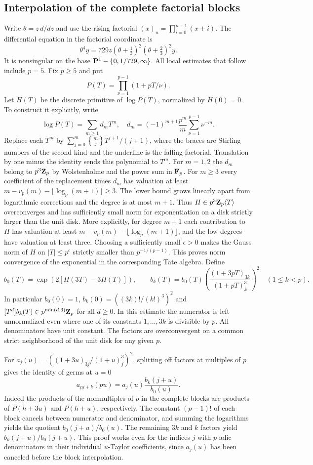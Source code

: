 \documentclass[11pt,letterpaper]{article}
\theoremstyle{definition}
\theoremstyle{remark}
\begin{document}
\subsection{Interpolation of the complete factorial blocks}
Write $\theta=z\,d/dz$ and use the rising factorial $(x)_n=\prod_{i=0}^{n-1}(x+i)$.
The differential equation in the factorial coordinate is
\begin{equation}\label{IV:eq:pf-shift}
 \theta^4 y=729z(\theta+\tfrac13)^2(\theta+\tfrac23)^2y .
\end{equation}
It is nonsingular on the base $\mathbf P^1-\{0,1/729,\infty\}$.
All local estimates that follow include $p=5$.
Fix $p\ge5$ and put
\[
 P(T)=\prod_{\nu=1}^{p-1}(1+pT/\nu).
\]
Let $H(T)$ be the discrete primitive of $\log P(T)$, normalized by
$H(0)=0$. To construct it explicitly, write
\[
 \log P(T)=\sum_{m\ge1}d_m T^m,\quad
 d_m=(-1)^{m+1}\frac{p^m}{m}\sum_{\nu=1}^{p-1}\nu^{-m}.
\]
Replace each $T^m$ by
$\sum_{j=0}^m \genfrac{\{}{\}}{0pt}{}{m}{j}T^{\underline{j+1}}/(j+1)$, where the
braces are Stirling numbers of the second kind and the underline is
the falling factorial. Translation by one minus the identity sends
this polynomial to $T^m$. For $m=1,2$ the $d_m$ belong to
$p^3\mathbf Z_p$ by Wolstenholme and the power sum in $\mathbf F_p$.
For $m\ge3$ every coefficient of the replacement times $d_m$ has
valuation at least $m-v_p(m)-\lfloor\log_p(m+1)\rfloor\ge3$.
The lower bound grows linearly apart from logarithmic corrections and
the degree is at most $m+1$. Thus $H\in p^3\mathbf Z_p\langle T\rangle$
overconverges and has sufficiently small norm for exponentiation on
a disk strictly larger than the unit disk. More explicitly, for degree
$m+1$ each contribution to $H$ has valuation at least
$m-v_p(m)-\lfloor\log_p(m+1)\rfloor$, and the low degrees have
valuation at least three. Choosing a sufficiently small $\epsilon>0$
makes the Gauss norm of $H$ on $|T|\le p^\epsilon$ strictly smaller
than $p^{-1/(p-1)}$. This proves norm convergence of the exponential
in the corresponding Tate algebra. Define
\[
 b_0(T)=\exp(2[H(3T)-3H(T)]),\qquad
 b_k(T)=b_0(T)\left(\frac{(1+3pT)_{3k}}{(1+pT)_k^3}\right)^2
 \quad (1\le k<p).
\]
In particular $b_0(0)=1$, $b_k(0)=((3k)!/(k!)^3)^2$ and
$[T^d]b_k(T)\in p^{\min(d,3)}\mathbf Z_p$ for all $d\ge0$.
In this estimate the numerator is left unnormalized even where one
of its constants $1,\ldots,3k$ is divisible by $p$. All denominators
have unit constant. The factors are overconvergent on a common strict
neighborhood of the unit disk for any given $p$.

For $a_j(u)=((1+3u)_{3j}/(1+u)_j^3)^2$, splitting off factors
at multiples of $p$ gives the identity of germs at $u=0$
\[
 a_{pj+k}(pu)=a_j(u)\frac{b_k(j+u)}{b_0(u)} .
\]
Indeed the products of the nonmultiples of $p$ in the complete blocks
are products of $P(h+3u)$ and $P(h+u)$, respectively. The constant
$(p-1)!$ of each block cancels between numerator and denominator, and
summing the logarithms yields the quotient $b_0(j+u)/b_0(u)$.
The remaining $3k$ and $k$ factors yield $b_k(j+u)/b_0(j+u)$.
This proof works even for the indices $j$ with $p$-adic denominators
in their individual $u$-Taylor coefficients, since $a_j(u)$ has
been canceled before the block interpolation.
\end{document}
